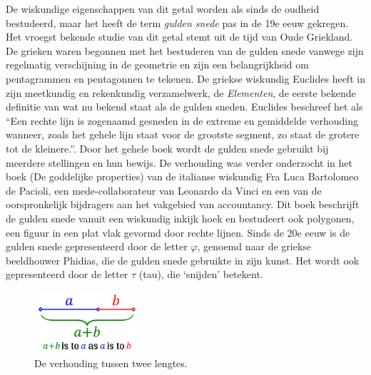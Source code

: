 \documentclass{article}
\begin{document}
De wiskundige eigenschappen van dit getal worden als sinds de oudheid bestudeerd, maar het heeft de term \textit{gulden snede} pas in de 19e eeuw gekregen. Het vroegst bekende studie van dit getal stemt uit de tijd van Oude Griekland. De grieken waren begonnen met het bestuderen van de gulden snede vanwege zijn regelmatig verschijning in de geometrie en zijn een belangrijkheid om pentagrammen en pentagonnen te tekenen. De griekse wiskundig Euclides heeft in zijn meetkundig en rekenkundig verzamelwerk, de \textit{Elementen}, de eerste bekende definitie van wat nu bekend staat als de gulden sneden. Euclides beschreef het als ``Een rechte lijn is zogenaamd gesneden in de extreme en gemiddelde verhouding wanneer, zoals het gehele lijn staat voor de grootste segment, zo staat de grotere tot de kleinere.''. Door het gehele boek wordt de gulden snede gebruikt bij meerdere stellingen en hun bewijs. De verhouding was verder onderzocht in het boek  (De goddelijke properties) van de italianse wiskundig Fra Luca Bartolomeo de Pacioli, een mede-collaborateur van Leonardo da Vinci en een van de oorspronkelijk bijdragers aan het vakgebied van accountancy. Dit boek beschrijft de gulden snede vanuit een wiskundig inkijk hoek en bestudeert ook polygonen, een figuur in een plat vlak gevormd door rechte lijnen. Sinds de 20e eeuw is de gulden snede gepresenteerd door de letter \(\varphi\), genoemd naar de griekse beeldhouwer Phidias, die de gulden snede gebruikte in zijn kunst. Het wordt ook gepresenteerd door de letter \(\tau\) (tau), die `snijden' betekent.


\begin{figure}[Hh]
		\centering
		\includegraphics[width=0.35\textwidth]{golden-ratio-line.png}
		\caption{De verhouding tussen twee lengtes.}
		\label{fig:ratio-lines}
	\end{figure}
\end{document}

